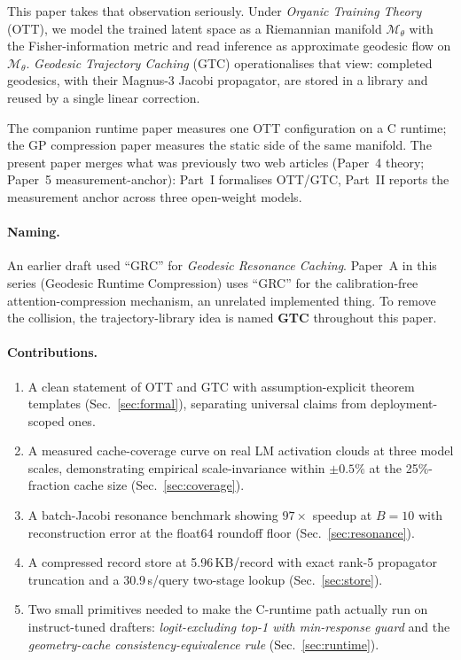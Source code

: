 \documentclass[11pt]{article}
\begin{document}
This paper takes that observation seriously. Under \emph{Organic Training
Theory} (OTT), we model the trained latent space as a Riemannian manifold
$\mathcal{M}_\theta$ with the Fisher-information metric and read inference as
approximate geodesic flow on $\mathcal{M}_\theta$. \emph{Geodesic Trajectory
Caching} (GTC) operationalises that view: completed geodesics, with their
Magnus-3 Jacobi propagator, are stored in a library and reused by a single
linear correction.

The companion runtime paper \cite{papers3specdec} measures one OTT
configuration on a C runtime; the GP compression paper
\cite{papers2geodesic_projection} measures the static side of the same
manifold. The present paper merges what was previously two web articles
(Paper~4 theory; Paper~5 measurement-anchor): Part~I formalises OTT/GTC,
Part~II reports the measurement anchor across three open-weight models.

\paragraph{Naming.} An earlier draft used ``GRC'' for \emph{Geodesic Resonance
Caching}. Paper~A in this series (Geodesic Runtime Compression) uses ``GRC''
for the calibration-free attention-compression mechanism, an unrelated
implemented thing. To remove the collision, the trajectory-library idea is
named \textbf{GTC} throughout this paper.

\paragraph{Contributions.}
\begin{enumerate}
  \item A clean statement of OTT and GTC with assumption-explicit theorem
        templates (Sec.~\ref{sec:formal}), separating universal claims from
        deployment-scoped ones.
  \item A measured cache-coverage curve on real LM activation clouds at three
        model scales, demonstrating empirical scale-invariance within
        $\pm 0.5\%$ at the 25\%-fraction cache size (Sec.~\ref{sec:coverage}).
  \item A batch-Jacobi resonance benchmark showing $97\times$ speedup at
        $B=10$ with reconstruction error at the float64 roundoff floor
        (Sec.~\ref{sec:resonance}).
  \item A compressed record store at 5.96\,KB/record with exact rank-5
        propagator truncation and a 30.9\,\textmu s/query two-stage lookup
        (Sec.~\ref{sec:store}).
  \item Two small primitives needed to make the C-runtime path actually run on
        instruct-tuned drafters: \emph{logit-excluding top-1 with min-response
        guard} and the \emph{geometry-cache consistency-equivalence rule}
        (Sec.~\ref{sec:runtime}).
\end{enumerate}
\end{document}
